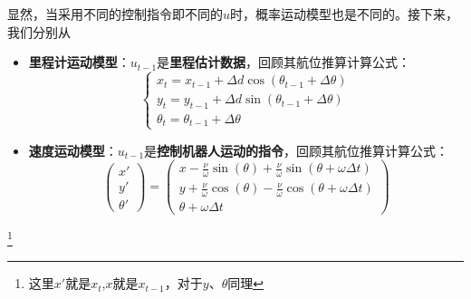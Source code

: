 \documentclass[../main.tex]{subfiles}
\begin{document}
        显然，当采用不同的控制指令即不同的$u$时，概率运动模型也是不同的。接下来，我们分别从
        \begin{itemize}
            \item \textbf{里程计运动模型}：$u_{t-1}$是\textbf{里程估计数据}，回顾其航位推算计算公式：
            $$\begin{cases}x_t=x_{t-1}+\Delta d\cos(\theta_{t-1}+\Delta\theta)\\y_t=y_{t-1}+\Delta d\sin(\theta_{t-1}+\Delta\theta)\\\theta_t=\theta_{t-1}+\Delta\theta\end{cases}$$
            \item \textbf{速度运动模型}：$u_{t-1}$是\textbf{控制机器人运动的指令}，回顾其航位推算计算公式：
            $$\left.\left(\begin{array}{c}x'\\y'\\\theta'\end{array}\right.\right)=\left(\begin{array}{c}x-\frac{\nu}{\omega}\sin(\theta)+\frac{\nu}{\omega}\sin(\theta+\omega\Delta t)\\y+\frac{\nu}{\omega}\cos(\theta)-\frac{\nu}{\omega}\cos(\theta+\omega\Delta t)\\\theta+\omega\Delta t\end{array}\right)$$
        \end{itemize}\footnote{这里$x'$就是$x_{t}$,$x$就是$x_{t-1}$，对于$y、\theta$同理}
\label{yundongmoxing}
\end{document}
